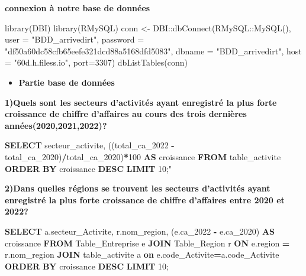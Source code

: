 \documentclass[mstat,12pt]{unswthesis}
\newenvironment{Shaded}{\begin{snugshade}}{\end{snugshade}}
\newcommand{\AttributeTok}[1]{\textcolor[rgb]{0.77,0.63,0.00}{#1}}
\newcommand{\DecValTok}[1]{\textcolor[rgb]{0.00,0.00,0.81}{#1}}
\newcommand{\FunctionTok}[1]{\textcolor[rgb]{0.00,0.00,0.00}{#1}}
\newcommand{\KeywordTok}[1]{\textcolor[rgb]{0.13,0.29,0.53}{\textbf{#1}}}
\newcommand{\NormalTok}[1]{#1}
\newcommand{\OperatorTok}[1]{\textcolor[rgb]{0.81,0.36,0.00}{\textbf{#1}}}
\newcommand{\OtherTok}[1]{\textcolor[rgb]{0.56,0.35,0.01}{#1}}
\newcommand{\SpecialCharTok}[1]{\textcolor[rgb]{0.00,0.00,0.00}{#1}}
\newcommand{\StringTok}[1]{\textcolor[rgb]{0.31,0.60,0.02}{#1}}
\begin{document}
\textbf{connexion à notre base de données}

\begin{Shaded}
\begin{Highlighting}[]
\FunctionTok{library}\NormalTok{(DBI)}
\FunctionTok{library}\NormalTok{(RMySQL)}
\NormalTok{conn }\OtherTok{\textless{}{-}}\NormalTok{ DBI}\SpecialCharTok{::}\FunctionTok{dbConnect}\NormalTok{(RMySQL}\SpecialCharTok{::}\FunctionTok{MySQL}\NormalTok{(), }
                  \AttributeTok{user =} \StringTok{"BDD\_arrivedirt"}\NormalTok{, }
                  \AttributeTok{password =} \StringTok{"df50a60dc58cfb65eefe321dcd88a5168dfd5083"}\NormalTok{, }
                  \AttributeTok{dbname =} \StringTok{"BDD\_arrivedirt"}\NormalTok{, }
                  \AttributeTok{host =} \StringTok{"60d.h.filess.io"}\NormalTok{,}
                \AttributeTok{port=}\DecValTok{3307}\NormalTok{)}
\FunctionTok{dbListTables}\NormalTok{(conn)}
\end{Highlighting}
\end{Shaded}

\begin{itemize}
\tightlist
\item
  \textbf{Partie base de données}
\end{itemize}

\textbf{1)Quels sont les secteurs d'activités ayant enregistré la plus
forte croissance de chiffre d'affaires au cours des trois dernières
années(2020,2021,2022)?}

\bigskip

\begin{Shaded}
\begin{Highlighting}[]
\KeywordTok{SELECT}\NormalTok{ secteur\_activite,}
\NormalTok{((total\_ca\_2022 }\OperatorTok{{-}}\NormalTok{ total\_ca\_2020)}\OperatorTok{/}\NormalTok{total\_ca\_2020)}\OperatorTok{*}\DecValTok{100} \KeywordTok{AS}\NormalTok{ croissance}
\KeywordTok{FROM}\NormalTok{ table\_activite}
\KeywordTok{ORDER} \KeywordTok{BY}\NormalTok{ croissance }\KeywordTok{DESC}
\KeywordTok{LIMIT} \DecValTok{10}\NormalTok{;}\OtherTok{"}
\end{Highlighting}
\end{Shaded}

\textbf{2)Dans quelles régions se trouvent les secteurs d'activités
ayant enregistré la plus forte croissance de chiffre d'affaires entre
2020 et 2022?} \medskip

\begin{Shaded}
\begin{Highlighting}[]
\KeywordTok{SELECT}\NormalTok{ a.secteur\_Activite, r.nom\_region, }
\NormalTok{       (e.ca\_2022 }\OperatorTok{{-}}\NormalTok{ e.ca\_2020) }\KeywordTok{AS}\NormalTok{ croissance}
\KeywordTok{FROM}\NormalTok{ Table\_Entreprise e}
\KeywordTok{JOIN}\NormalTok{ Table\_Region r }\KeywordTok{ON}\NormalTok{ e.region }\OperatorTok{=}\NormalTok{ r.nom\_region}
\KeywordTok{JOIN}\NormalTok{ table\_activite a }\KeywordTok{on}\NormalTok{ e.code\_Activite}\OperatorTok{=}\NormalTok{a.code\_Activite}
\KeywordTok{ORDER} \KeywordTok{BY}\NormalTok{ croissance }\KeywordTok{DESC}
\KeywordTok{LIMIT} \DecValTok{10}\NormalTok{;}
\end{Highlighting}
\end{Shaded}
\end{document}
